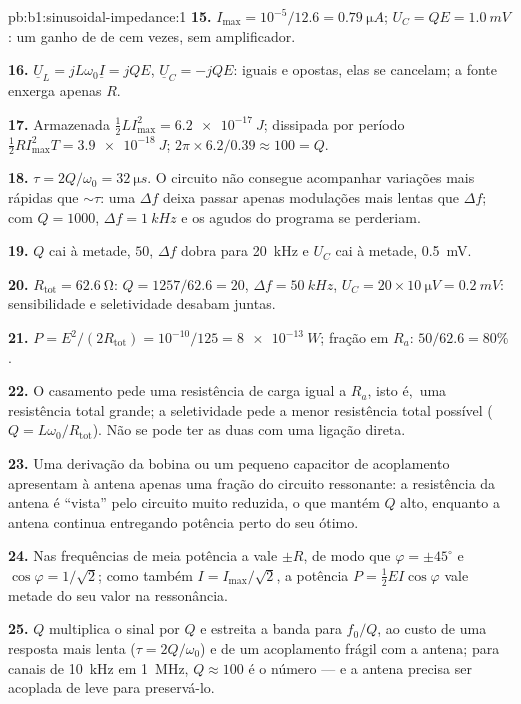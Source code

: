 \begin{solution}{pb:b1:sinusoidal-impedance:1}
\textbf{15.} $I_{\max} = 10^{-5}/12.6 = \qty{0.79}{\micro A}$; $U_C = QE =
\qty{1.0}{mV}$: um ganho de  de cem vezes, sem amplificador.

\textbf{16.} $\underline U_L = jL\omega_0\underline I = jQE$, $\underline U_C
= -jQE$: iguais e opostas, elas se cancelam; a fonte enxerga apenas $R$.

\textbf{17.} Armazenada $\tfrac12 LI_{\max}^2 = \qty{6.2e-17}{J}$; dissipada
por período $\tfrac12 RI_{\max}^2T = \qty{3.9e-18}{J}$; $2\pi \times 6.2/0.39
\approx 100 = Q$.

\textbf{18.} $\tau = 2Q/\omega_0 = \qty{32}{\micro s}$. O circuito não consegue
acompanhar variações mais rápidas que $\sim\tau$: uma  $\Delta f$ deixa passar
apenas modulações mais lentas que $\Delta f$; com $Q = 1000$, $\Delta f =
\qty{1}{kHz}$ e os agudos do programa se perderiam.

\textbf{19.} $Q$ cai à metade, $50$, $\Delta f$ dobra para \qty{20}{kHz} e $U_C$
cai à metade, \qty{0.5}{mV}.

\textbf{20.} $R_{\text{tot}} = \qty{62.6}{\ohm}$: $Q = 1257/62.6 = 20$,
$\Delta f = \qty{50}{kHz}$, $U_C = 20 \times \qty{10}{\micro V} = \qty{0.2}{mV}$:
sensibilidade e seletividade desabam juntas.

\textbf{21.} $P = E^2/(2R_{\text{tot}}) = 10^{-10}/125 = \qty{8e-13}{W}$;
fração em $R_a$: $50/62.6 = 80\%$.

\textbf{22.} O casamento pede uma resistência de carga igual a $R_a$, isto é,\ uma
resistência total grande; a seletividade pede a menor resistência total
possível ($Q = L\omega_0/R_{\text{tot}}$). Não se pode ter as duas com uma
ligação direta.

\textbf{23.} Uma derivação da bobina ou um pequeno capacitor de acoplamento apresentam à antena
apenas uma fração do circuito ressonante: a resistência da antena
é ``vista'' pelo circuito muito reduzida, o que mantém $Q$ alto, enquanto a
antena continua entregando potência perto do seu ótimo.

\textbf{24.} Nas frequências de meia potência a  vale $\pm R$,
de modo que $\varphi = \pm45^\circ$ e $\cos\varphi = 1/\sqrt2$; como também $I =
I_{\max}/\sqrt2$, a potência $P = \tfrac12 EI\cos\varphi$ vale metade do seu valor
na ressonância.

\textbf{25.} $Q$ multiplica o sinal por $Q$ e estreita a banda para
$f_0/Q$, ao custo de uma resposta mais lenta ($\tau = 2Q/\omega_0$) e de um
acoplamento frágil com a antena; para canais de \qty{10}{kHz} em
\qty{1}{MHz}, $Q \approx 100$ é o número --- e a antena precisa ser
acoplada de leve para preservá-lo.
\end{solution}

